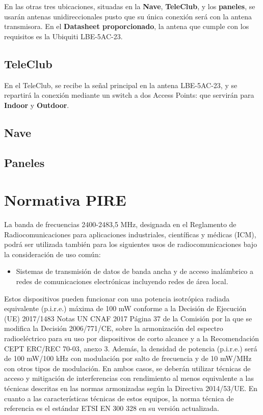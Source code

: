 \documentclass{article}
\begin{document}
\quad

En las otras tres ubicaciones, situadas en la \textbf{Nave}, \textbf{TeleClub}, y los \textbf{paneles}, se usarán antenas unidireccionales pusto que su única conexión será con la antena transmisora. En el \textbf{Datasheet proporcionado}, la antena que cumple con los requisitos es la Ubiquiti LBE-5AC-23.

\subsection{TeleClub}

En el TeleClub, se recibe la señal principal en la antena LBE-5AC-23, y se repartirá la conexión mediante un switch a dos Access Points: que servirán para \textbf{Indoor} y \textbf{Outdoor}.    


\subsection{Nave}
\subsection{Paneles}

\section{Normativa PIRE}

La banda de frecuencias 2400-2483,5 MHz, designada en el Reglamento de
Radiocomunicaciones para aplicaciones industriales, científicas y médicas (ICM),
podrá ser utilizada también para los siguientes usos de radiocomunicaciones bajo la
consideración de uso común:

\begin{itemize}

    \item Sistemas de transmisión de datos de banda ancha y de acceso inalámbrico
    a redes de comunicaciones electrónicas incluyendo redes de área local.

\end{itemize}

    Estos dispositivos pueden funcionar con una potencia isotrópica radiada equivalente
    (p.i.r.e.) máxima de 100 mW conforme a la Decisión de Ejecución (UE) 2017/1483
    Notas UN CNAF 2017 Página 37
    de la Comisión por la que se modifica la Decisión 2006/771/CE, sobre la
    armonización del espectro radioeléctrico para su uso por dispositivos de corto
    alcance y a la Recomendación CEPT ERC/REC 70-03, anexo 3.
    Además, la densidad de potencia (p.i.r.e.) será de 100 mW/100 kHz con modulación
    por salto de frecuencia y de 10 mW/MHz con otros tipos de modulación. En ambos
    casos, se deberán utilizar técnicas de acceso y mitigación de interferencias con
    rendimiento al menos equivalente a las técnicas descritas en las normas
    armonizadas según la Directiva 2014/53/UE.
    En cuanto a las características técnicas de estos equipos, la norma técnica de
    referencia es el estándar ETSI EN 300 328 en su versión actualizada.
\end{document}
